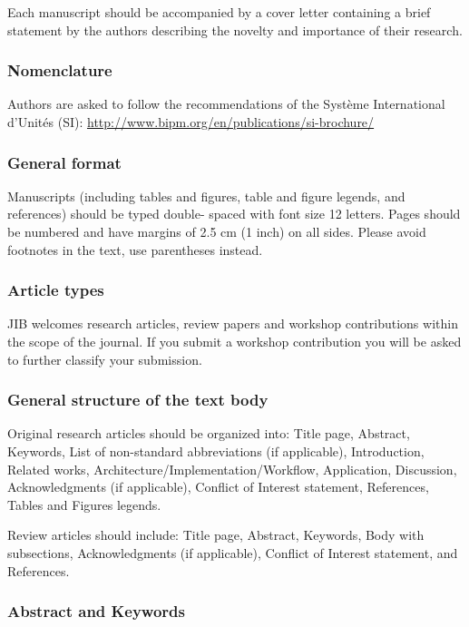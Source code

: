 \documentclass{jib}
\begin{document}
Each manuscript should be accompanied by a cover letter containing a brief
statement by the authors describing the novelty and importance of their
research.

\subsubsection{Nomenclature}

Authors are asked to follow the recommendations of the
Syst\`eme International d'Unit\'es (SI):
\url{http://www.bipm.org/en/publications/si-brochure/}

\subsubsection{General format}

Manuscripts (including tables and figures, table and figure legends, and
references) should be typed double- spaced with font size 12 letters. Pages
should be numbered and have margins of 2.5 cm (1 inch) on all sides. Please
avoid footnotes in the text, use parentheses instead.

\subsubsection{Article types}

JIB welcomes research articles, review papers and workshop contributions within
the scope of the journal. If you submit a workshop contribution you will be
asked to further classify your submission.

\subsubsection{General structure of the text body}

Original research articles should be organized into: Title page, Abstract,
Keywords, List of non-standard abbreviations (if applicable), Introduction,
Related works, Architecture/Implementation/Workflow, Application, Discussion,
Acknowledgments (if applicable), Conflict of Interest statement, References,
Tables and Figures legends.

Review articles should include: Title page, Abstract, Keywords, Body with
subsections, Acknowledgments (if applicable), Conflict of Interest statement,
and References.

\subsubsection{Abstract and Keywords}
\end{document}
